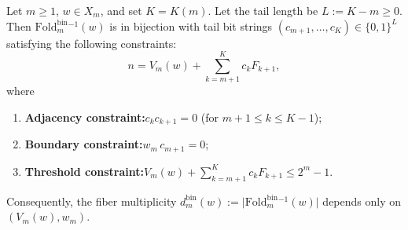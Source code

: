 \begin{proposition}\label{prop:fold-bin-fiber-tail}
Let \(m\ge 1\), \(w\in X_m\), and set \(K=K(m)\). Let the tail length be \(L:=K-m\ge 0\).
Then \(\mathrm{Fold}^{\mathrm{bin}}_m{}^{-1}(w)\) is in bijection with tail bit strings \((c_{m+1},\dots,c_K)\in\{0,1\}^{L}\) satisfying the following constraints:
\[
n
=V_m(w)+\sum_{k=m+1}^{K} c_k F_{k+1},
\]
where
\begin{enumerate}
  \item \textbf{Adjacency constraint:}\quad \(c_k c_{k+1}=0\) (for \(m+1\le k\le K-1\));
  \item \textbf{Boundary constraint:}\quad \(w_m\,c_{m+1}=0\);
  \item \textbf{Threshold constraint:}\quad \(V_m(w)+\sum_{k=m+1}^{K} c_k F_{k+1}\le 2^m-1\).
\end{enumerate}
Consequently, the fiber multiplicity
\(
d^{\mathrm{bin}}_m(w):=\bigl|\mathrm{Fold}^{\mathrm{bin}}_m{}^{-1}(w)\bigr|
\)
depends only on \((V_m(w),w_m)\).
\end{proposition}

